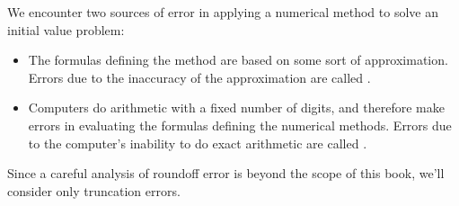 \documentclass{ximera}
\begin{document}
We encounter two sources of error
in applying a numerical method to solve an initial value problem:
\begin{itemize}
\item
The formulas defining the method are based on some sort of
approximation. Errors due to the inaccuracy of the approximation are
called .
\item
Computers do arithmetic with a fixed number of digits, and therefore
make errors in evaluating the formulas defining the numerical methods.
Errors due to the computer's inability to do exact arithmetic are
called .
\end{itemize}
 
Since a careful analysis of roundoff error is beyond the scope of this
book, we'll consider only truncation errors.
 
\end{document}
